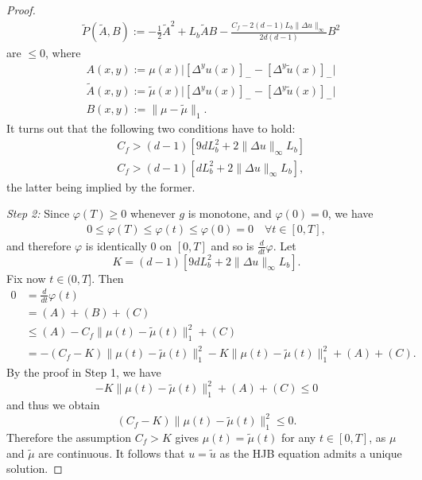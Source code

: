 \documentclass[10pt,a4paper]{amsart}
\newcommand{\norm}[1]{\|#1\|}
\begin{document}
\begin{proof}
\begin{align*}
    &\tilde{P}(\tilde{A},B) := -\frac{1}{2}\tilde{A}^2 + L_b \tilde{A}B - \frac{C_f - 2(d-1)L_b \norm{\Delta u}_{\infty}}{2d(d-1)} B^2
\end{align*}
are $\leq 0$, where
\begin{align*}
    &A(x,y) := \mu(x) \Big| [\Delta^{y}u(x)]_- - [\Delta^{y}\tilde{u}(x)]_- \Big| \\
    &\tilde{A}(x,y) := \tilde\mu(x) \Big| [\Delta^{y}u(x)]_- - [\Delta^{y}\tilde{u}(x)]_- \Big| \\
    &B(x,y) := \norm{\mu - \tilde{\mu}}_1.
\end{align*}
It turns out that the following two conditions have to hold:
\begin{align*}
    &C_f > (d-1) [9 d L_b^2 + 2 \norm{\Delta u}_\infty L_b] \\
    &C_f > (d-1) [d L_b^2 + 2 \norm{\Delta u}_\infty L_b],
\end{align*}
the latter being implied by the former.

\emph{Step 2:}
%
Since $\varphi(T) \geq 0$ whenever $g$ is monotone, and $\varphi(0) = 0$, we have
\begin{align*}
    0 \leq \varphi(T) \leq \varphi(t) \leq \varphi(0) = 0 \quad \forall t \in [0,T],
\end{align*}
and therefore $\varphi$ is identically 0 on $[0,T]$ and so is $\frac{d}{dt}\varphi$. 
Let 
$$K = (d-1) [9 d L_b^2 + 2 \norm{\Delta u}_{\infty} L_b].$$ 
Fix now $t\in (0,T]$. Then
\begin{align*}
    0
    &= \frac{d}{dt}\varphi(t) \\
    &= (A) + (B) + (C) \\
    &\leq (A) - C_f \norm{\mu(t)-\tilde{\mu}(t)}_1^2 + (C) \\
    &= - (C_f - K) \norm{\mu(t)-\tilde{\mu}(t)}_1^2 - K \norm{\mu(t)-\tilde{\mu}(t)}_1^2 + (A) + (C) .
\end{align*}
By the proof in Step 1, we have
\[
- K \norm{\mu(t)-\tilde{\mu}(t)}_1^2 + (A) + (C) \leq 0
\] 
and thus we obtain 
\[
 (C_f - K) \norm{\mu(t)-\tilde{\mu}(t)}_1^2 \leq 0.
\] 
Therefore the assumption $C_f>K$ gives $\mu(t)= \tilde{\mu}(t)$ for any $t\in [0,T]$, as $\mu$ and $\tilde{\mu}$ are continuous. It follows that $u=\tilde{u}$ as the HJB equation admits a unique solution.
\end{proof}
\end{document}
